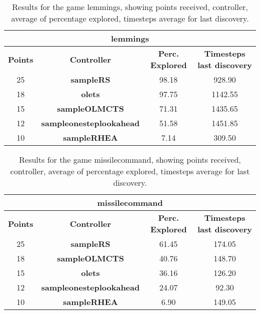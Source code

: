 \begin{table*}[!t]
\begin{center}
\begin{tabular}{|c|c|c|c|}
\multicolumn{4}{c}{\textbf{lemmings}}\\
\hline
\textbf{Points} & \textbf{Controller} & \textbf{Perc. Explored} &  \textbf{Timesteps last discovery}\\
\hline
25 & \textbf{sampleRS} & 98.18 & 928.90
 \\
\hline
18 & \textbf{olets} & 97.75 & 1142.55
 \\
\hline
15 & \textbf{sampleOLMCTS} & 71.31 & 1435.65
 \\
\hline
12 & \textbf{sampleonesteplookahead} & 51.58 & 1451.85
 \\
\hline
10 & \textbf{sampleRHEA} & 7.14 & 309.50
 \\
\hline
\end{tabular}
\caption{Results for the game lemmings, showing points received, controller, average of percentage explored, timesteps average for last discovery.}
\label{tab:weights}
\end{center}
\end{table*}
\begin{table*}[!t]
\begin{center}
\begin{tabular}{|c|c|c|c|}
\multicolumn{4}{c}{\textbf{missilecommand}}\\
\hline
\textbf{Points} & \textbf{Controller} & \textbf{Perc. Explored} &  \textbf{Timesteps last discovery}\\
\hline
25 & \textbf{sampleRS} & 61.45 & 174.05
 \\
\hline
18 & \textbf{sampleOLMCTS} & 40.76 & 148.70
 \\
\hline
15 & \textbf{olets} & 36.16 & 126.20
 \\
\hline
12 & \textbf{sampleonesteplookahead} & 24.07 & 92.30
 \\
\hline
10 & \textbf{sampleRHEA} & 6.90 & 149.05
 \\
\hline
\end{tabular}
\caption{Results for the game missilecommand, showing points received, controller, average of percentage explored, timesteps average for last discovery.}
\label{tab:weights}
\end{center}
\end{table*}
